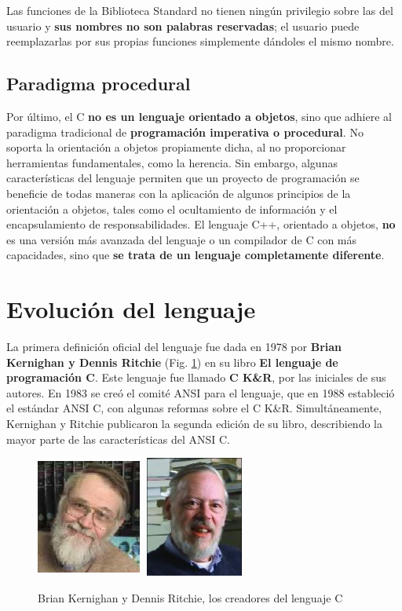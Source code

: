 Las funciones de la Biblioteca Standard no tienen ningún
privilegio sobre las del usuario y \textbf{sus nombres no son palabras
reservadas}; el usuario puede reemplazarlas por sus propias funciones
simplemente dándoles el mismo nombre. 

\subsection{Paradigma procedural}
Por último, el C \textbf{no es un lenguaje orientado a objetos}, sino que
adhiere al paradigma tradicional de \textbf{programación imperativa o procedural}. No
soporta la orientación a objetos propiamente dicha, al no
proporcionar herramientas fundamentales, como la herencia. Sin embargo,
algunas características del lenguaje permiten que un proyecto de
programación se beneficie de todas maneras con la aplicación de
algunos principios de la orientación a objetos, tales como el
ocultamiento de información y el encapsulamiento de
responsabilidades. El lenguaje C++, orientado a objetos, \textbf{no }es
una versión más avanzada del lenguaje o un compilador de C con
más capacidades, sino que \textbf{se trata de un lenguaje completamente
diferente}. 


\section{Evolución del lenguaje}
La primera definición oficial del lenguaje fue dada en 1978 por
\textbf{Brian Kernighan y Dennis Ritchie} (Fig. \ref{fig:kandr}) en su libro \textbf{El
lenguaje de programación C}. Este lenguaje fue llamado
\textbf{C K\&R}, por las iniciales de sus autores. En 1983 se creó el comité
ANSI para el lenguaje, que en 1988 estableció el estándar ANSI C, con algunas reformas
sobre el C K\&R. Simultáneamente, Kernighan y Ritchie publicaron la
segunda edición de su libro, describiendo la mayor parte de las
características del ANSI C. 


 \begin{figure}[htbp] 
 \centering 
 \includegraphics[width=3.44cm,height=3.969cm]{./img/kernighan.jpg} 
 \includegraphics[width=3.44cm,height=3.969cm]{./img/dennis_ritchie.jpg} 
 \caption{Brian Kernighan y Dennis Ritchie, los creadores del lenguaje C} 
 \label{fig:kandr} 
 \end{figure} 


